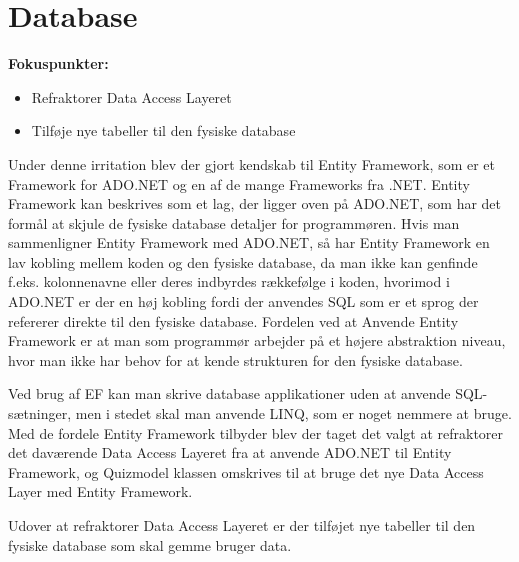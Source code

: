 \section{Database}

\textbf{Fokuspunkter:}
	\begin{itemize}
			\item Refraktorer Data Access Layeret 
			\item Tilføje nye tabeller til den fysiske database
	\end{itemize}


Under denne irritation blev der gjort kendskab til Entity Framework, som er et Framework for ADO.NET og en af de mange Frameworks fra .NET. Entity Framework kan beskrives som et lag, der ligger oven på ADO.NET, som har det formål at skjule de fysiske database detaljer for programmøren. Hvis man sammenligner Entity Framework med ADO.NET, så har Entity Framework en lav kobling mellem koden og den fysiske database, da man ikke kan genfinde f.eks. kolonnenavne eller deres indbyrdes rækkefølge i koden, hvorimod i ADO.NET er der en høj kobling fordi der anvendes SQL som er et sprog der refererer direkte til den fysiske database. Fordelen ved at Anvende Entity Framework er at man som programmør arbejder på et højere abstraktion niveau, hvor man ikke har behov for at kende strukturen for den fysiske database. 

Ved brug af EF kan man skrive database applikationer uden at anvende SQL-sætninger, men i stedet skal man anvende LINQ, som er noget nemmere at bruge. Med de fordele Entity Framework tilbyder blev der taget det valgt at refraktorer det daværende Data Access Layeret fra at anvende ADO.NET til Entity Framework, og Quizmodel klassen omskrives til at bruge det nye Data Access Layer med Entity Framework. 

Udover at refraktorer Data Access Layeret er der tilføjet nye tabeller til den fysiske database som skal gemme bruger data. 

